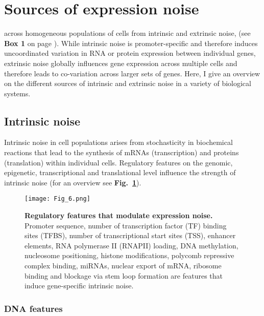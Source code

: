 
\section{Sources of expression noise} 

 across homogeneous populations of cells  from intrinsic and extrinsic noise,  (see \textbf{Box 1} on page \pageref{box1}). 
While intrinsic noise is promoter-specific and therefore induces uncoordinated variation in RNA or protein expression between individual genes, extrinsic noise globally influences gene expression across multiple cells and therefore leads to co-variation across larger sets of genes. 
Here, I give an overview on the different sources of intrinsic and extrinsic noise in a variety of biological systems.

\subsection{Intrinsic noise}

Intrinsic noise in cell populations arises from stochasticity in biochemical reactions that lead to the synthesis of mRNAs (transcription) and proteins (translation) within individual cells. 
Regulatory features on the genomic, epigenetic, transcriptional and translational level influence  the strength of intrinsic noise (for an overview see \textbf{Fig.~\ref{fig0:overview_intrinsic}}).

\begin{figure}[!h]
\centering
\texttt{[image: Fig\_6.png]}
\caption[Regulatory features that modulate expression noise]{\textbf{Regulatory features that modulate expression noise.}\\
Promoter sequence, number of transcription factor (TF) binding sites (TFBS), number of transcriptional start sites (TSS), enhancer elements, RNA polymerase II (RNAPII) loading, DNA methylation, nucleosome positioning, histone modifications, polycomb repressive complex binding, \glspl{miRNA}, nuclear export of mRNA, ribosome binding and blockage via stem loop formation are features that induce gene-specific intrinsic noise.}
\label{fig0:overview_intrinsic}
\end{figure}

\subsubsection{DNA features}

